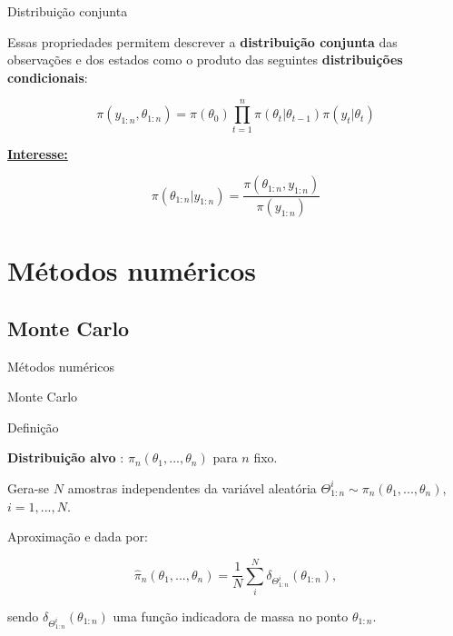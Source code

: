 \documentclass{beamer}
\begin{document}
\begin{frame}{Distribuição conjunta}

Essas propriedades permitem descrever a \textbf{distribuição conjunta} das observações e dos estados como o produto das seguintes \textbf{distribuições condicionais}:

$$
\pi(y_{1:n},\theta_{1:n}) = \pi(\theta_0) \prod_{t=1}^n \pi(\theta_t|\theta_{t-1})\pi(y_t|\theta_t) 
$$

\underline{\textbf{Interesse:}}

$$\pi(\theta_{1:n}|y_{1:n}) =  \frac{\pi(\theta_{1:n},y_{1:n})}{\pi(y_{1:n})} $$


\end{frame}




\section{Métodos numéricos}



\subsection{Monte Carlo}

\begin{frame}{Métodos numéricos}

    \begin{block}{}
      \Huge  Monte Carlo
    \end{block}


\end{frame}

\begin{frame}{Definição}

\textbf{Distribuição alvo} : $\pi_n(\theta_1,...,\theta_n)$ para $n$ fixo.

\pause
\vspace{0.5cm}

Gera-se $N$ amostras independentes da variável aleatória $\Theta^i_{1:n} \sim \pi_n(\theta_1,...,\theta_n)$, $i=1,...,N$.

\pause
\vspace{0.5cm}

Aproximação e dada por:

$$
\hat{\pi}_n(\theta_1,...,\theta_n) = \frac{1}{N}\sum_i^N \delta_{\Theta^i_{1:n}}(\theta_{1:n}),
$$

\vspace{0.5cm}
sendo $\delta_{\Theta_{1:n}^{i}}(\theta_{1:n})$ uma função indicadora de massa no ponto $\theta_{1:n}$.
\end{frame}
\end{document}
